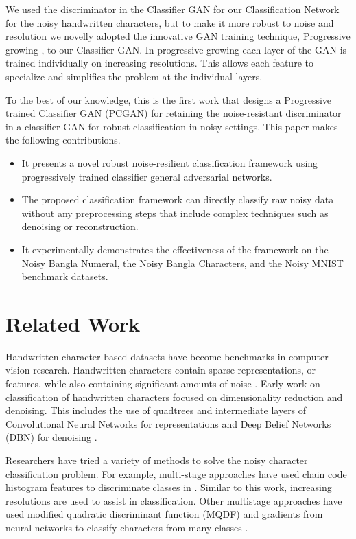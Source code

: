 \documentclass[runningheads]{llncs}
\begin{document}
We used the discriminator in the Classifier GAN for our Classification Network for the noisy handwritten characters, but to make it  more robust to noise and resolution we novelly adopted the innovative GAN training technique, Progressive growing \cite{nvidia2017progressive}, to our Classifier GAN. In progressive growing each layer of the GAN is trained individually on increasing resolutions. This allows each feature to specialize and simplifies the problem at the individual layers.
   
To the best of our knowledge, this is the first work that designs a Progressive trained Classifier GAN (PCGAN) for retaining the noise-resistant discriminator in a classifier GAN for  robust classification in noisy settings. This paper makes the following contributions.
\begin{itemize}
\item It presents a novel robust noise-resilient classification framework using  progressively trained  classifier general adversarial networks.
\item The proposed classification  framework can directly classify raw noisy data without any preprocessing  steps that include complex techniques such as denoising or reconstruction.
\item It experimentally demonstrates the effectiveness of the framework on the Noisy Bangla Numeral, the Noisy Bangla Characters, and the Noisy MNIST benchmark datasets.
\end{itemize}



\section{Related Work}\label{rw}
Handwritten character based datasets have become benchmarks in computer vision research. Handwritten characters contain sparse representations, or features, while also containing significant amounts of noise \cite{basu2017learning}. Early work on classification of handwritten characters focused on dimensionality reduction and denoising. This includes the use of quadtrees \cite{markas1992quad, aref1993decomposing, basu2017learning} and intermediate layers of Convolutional Neural Networks for representations and Deep Belief Networks (DBN) for denoising \cite{basu2017learning}.


Researchers have tried a variety of methods  to solve  the noisy character classification problem. For example, multi-stage approaches have used chain code histogram features to discriminate classes in \cite{bhattacharya2009handwritten}. Similar to this work, increasing resolutions are used to assist in classification. Other multistage approaches have used modified quadratic discriminant function (MQDF) and gradients from neural networks to classify characters from many classes \cite{bhattacharya2012offline}.
\end{document}
